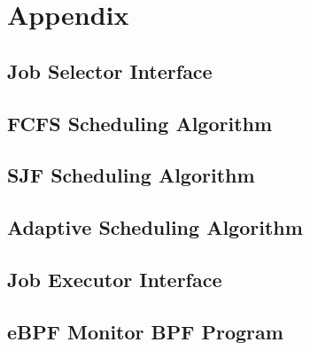 \chapter*{Appendix}
\renewcommand{\thelstlisting}{\arabic{lstlisting}}
\setcounter{lstlisting}{0}

\section*{Job Selector Interface}



\section*{FCFS Scheduling Algorithm}



\section*{SJF Scheduling Algorithm}



\section*{Adaptive Scheduling Algorithm}



\section*{Job Executor Interface}



\section*{eBPF Monitor BPF Program}


